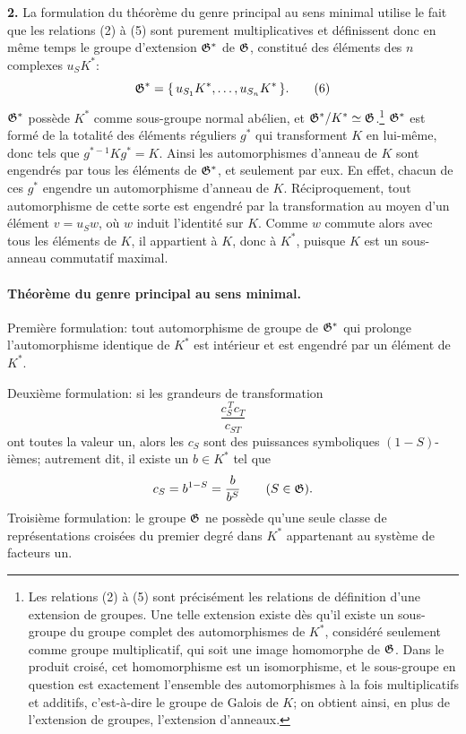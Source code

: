 \noindent\textbf{2.} La formulation du théorème du genre principal au sens minimal utilise le fait que les relations (2) à (5) sont purement multiplicatives et définissent donc en même temps le groupe d'extension \(\mathfrak G^*\) de \(\mathfrak G\), constitué des éléments des \(n\) complexes \(u_S K^*\):
\[
        \mathfrak G^*=\{\,u_{S_1}K^*,\ldots,u_{S_n}K^*\,\}.            \tag{6}
\]
\(\mathfrak G^*\) possède \(K^*\) comme sous-groupe normal abélien, et \(\mathfrak G^*/K^*\simeq\mathfrak G\).\footnote{Les relations (2) à (5) sont précisément les relations de définition d'une extension de groupes. Une telle extension existe dès qu'il existe un sous-groupe du groupe complet des automorphismes de \(K^*\), considéré seulement comme groupe multiplicatif, qui soit une image homomorphe de \(\mathfrak G\). Dans le produit croisé, cet homomorphisme est un isomorphisme, et le sous-groupe en question est exactement l'ensemble des automorphismes à la fois multiplicatifs et additifs, c'est-à-dire le groupe de Galois de \(K\); on obtient ainsi, en plus de l'extension de groupes, l'extension d'anneaux.} \(\mathfrak G^*\) est formé de la totalité des éléments réguliers \(g^*\) qui transforment \(K\) en lui-même, donc tels que \(g^{*-1}Kg^*=K\). Ainsi les automorphismes d'anneau de \(K\) sont engendrés par tous les éléments de \(\mathfrak G^*\), et seulement par eux. En effet, chacun de ces \(g^*\) engendre un automorphisme d'anneau de \(K\). Réciproquement, tout automorphisme de cette sorte est engendré par la transformation au moyen d'un élément \(v=u_Sw\), où \(w\) induit l'identité sur \(K\). Comme \(w\) commute alors avec tous les éléments de \(K\), il appartient à \(K\), donc à \(K^*\), puisque \(K\) est un sous-anneau commutatif maximal.

\paragraph{Théorème du genre principal au sens minimal.}
Première formulation: tout automorphisme de groupe de \(\mathfrak G^*\) qui prolonge l'automorphisme identique de \(K^*\) est intérieur et est engendré par un élément de \(K^*\).

Deuxième formulation: si les grandeurs de transformation
\[
        \frac{c_S^{\,T}c_T}{c_{ST}}
\]
ont toutes la valeur un, alors les \(c_S\) sont des puissances symboliques \((1-S)\)-ièmes; autrement dit, il existe un \(b\in K^*\) tel que
\[
        c_S=b^{1-S}=\frac{b}{b^S}\qquad(S\in\mathfrak G).
\]
Troisième formulation: le groupe \(\mathfrak G\) ne possède qu'une seule classe de représentations croisées du premier degré dans \(K^*\) appartenant au système de facteurs un.

